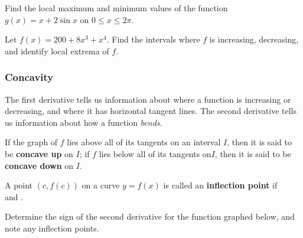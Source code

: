 \documentclass[notes]{subfiles}
\begin{document}
		\begin{ex}
			Find the local maximum and minimum values of the function \(g(x) = x + 2\sin x\) on \(0\leq x\leq 2\pi\).
		\end{ex}
			\newpage

		\begin{ex}
			Let \(f(x) = 200 + 8x^3 + x^4\).  Find the intervals where \(f\) is increasing, decreasing, and identify local extrema of \(f\).  
		\end{ex}
			
	\subsubsection*{Concavity}
		The first derivative tells us information about where a function is increasing or decreasing, and where it has horizontal tangent lines.  The second derivative tells us information about how a function \emph{bends}.
		\begin{defn}
			If the graph of \(f\) lies above all of its tangents on an interval \(I\), then it is said to be \textbf{concave up} on \(I\); if \(f\) lies below all of its tangents on\(I\), then it is said to be \textbf{concave down} on \(I\).  
		\end{defn}
		
		\begin{defn}
			A point \((c,f(c))\) on a curve \(y = f(x)\) is called an \textbf{inflection point} if \\[15pt]
			and .
		\end{defn}
		
		\begin{ex}
			Determine the sign of the second derivative for the function graphed below, and note any inflection points.
		\end{ex}
		\begin{flushleft}
		\end{flushleft}
		\newpage
	
\end{document}
